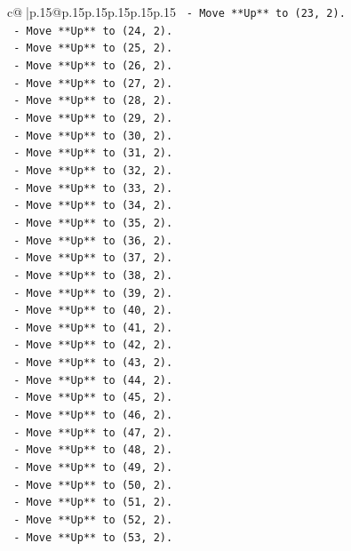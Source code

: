 \documentclass{article}
\begin{document}
{\begin{supertabular}{c@{$\;$}|p{.15\linewidth}@{}p{.15\linewidth}p{.15\linewidth}p{.15\linewidth}p{.15\linewidth}p{.15\linewidth}}
{{{\texttt{    {-} Move **Up** to (23, 2).} \\
\texttt{    {-} Move **Up** to (24, 2).} \\
\texttt{    {-} Move **Up** to (25, 2).} \\
\texttt{    {-} Move **Up** to (26, 2).} \\
\texttt{    {-} Move **Up** to (27, 2).} \\
\texttt{    {-} Move **Up** to (28, 2).} \\
\texttt{    {-} Move **Up** to (29, 2).} \\
\texttt{    {-} Move **Up** to (30, 2).} \\
\texttt{    {-} Move **Up** to (31, 2).} \\
\texttt{    {-} Move **Up** to (32, 2).} \\
\texttt{    {-} Move **Up** to (33, 2).} \\
\texttt{    {-} Move **Up** to (34, 2).} \\
\texttt{    {-} Move **Up** to (35, 2).} \\
\texttt{    {-} Move **Up** to (36, 2).} \\
\texttt{    {-} Move **Up** to (37, 2).} \\
\texttt{    {-} Move **Up** to (38, 2).} \\
\texttt{    {-} Move **Up** to (39, 2).} \\
\texttt{    {-} Move **Up** to (40, 2).} \\
\texttt{    {-} Move **Up** to (41, 2).} \\
\texttt{    {-} Move **Up** to (42, 2).} \\
\texttt{    {-} Move **Up** to (43, 2).} \\
\texttt{    {-} Move **Up** to (44, 2).} \\
\texttt{    {-} Move **Up** to (45, 2).} \\
\texttt{    {-} Move **Up** to (46, 2).} \\
\texttt{    {-} Move **Up** to (47, 2).} \\
\texttt{    {-} Move **Up** to (48, 2).} \\
\texttt{    {-} Move **Up** to (49, 2).} \\
\texttt{    {-} Move **Up** to (50, 2).} \\
\texttt{    {-} Move **Up** to (51, 2).} \\
\texttt{    {-} Move **Up** to (52, 2).} \\
\texttt{    {-} Move **Up** to (53, 2).} \\
}}}
\end{supertabular}}
\end{document}
